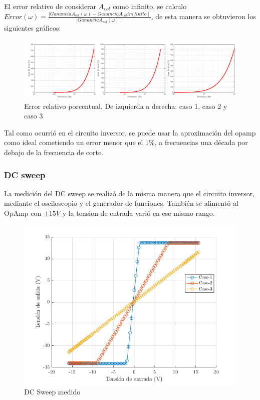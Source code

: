 \documentclass[../../main.tex]{subfiles}
\begin{document}
El error relativo de considerar $A_{vol}$  como infinito, se calculo $ Error(\omega) = \frac {\mid Ganancia A_{vol}(\omega) -Ganancia A_{vol} inifinito \mid} {\mid Ganancia A_{vol} (\omega) \mid }$, de esta manera se obtuvieron los siguientes gr\'aficos:

\begin{figure}[H]
\centering
\includegraphics[width=1\textwidth]{imagenes/error_n.png}
\caption{Error relativo porcentual. De izquierda a derecha: caso 1, caso 2 y caso 3} \label{fig=errorn}
\end{figure}

Tal como ocurri\'o en el circuito inversor, se puede usar la aproximaci\'on del opamp como ideal cometiendo un error menor que el $1\%$, a frecuencias una d\'ecada por debajo de la frecuencia de corte.


\subsubsection{DC sweep}
La medición del DC sweep se realizó de la misma manera que el circuito inversor, mediante el osciloscopio y el generador de funciones. Tambi\'en se aliment\'o al OpAmp con $\pm 15 V$ y la tension de entrada vari\'o en ese mismo rango.

\begin{figure}[H]
\centering
\includegraphics[width=1\textwidth]{imagenes/dc_sweep_n.png}
\caption{DC Sweep medido} \label{fig=dcn}
\end{figure}
\end{document}
